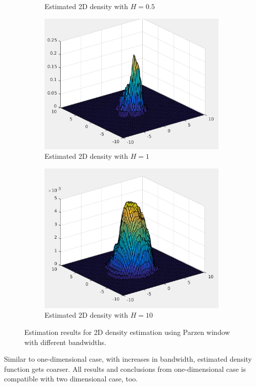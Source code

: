\documentclass[12pt]{article}
\begin{document}
\begin{itemize}
\begin{figure}[h]
\begin{subfigure}{0.45\textwidth}
\caption{Estimated 2D density with $H = 0.5$}
\end{subfigure}
\begin{subfigure}{0.45\textwidth}
\centering
\includegraphics[scale=0.35]{Imgs/5-30.png}
\caption{Estimated 2D density with $H = 1$}
\end{subfigure}
\begin{subfigure}{0.45\textwidth}
\centering
\includegraphics[scale=0.32]{Imgs/5-31.png}
\caption{Estimated 2D density with $H = 10$}
\end{subfigure}
\caption{Estimation results for 2D density estimation using Parzen window with different bandwidths.}
\label{fig:5-5}
\end{figure}
Similar to one-dimensional case, with increases in bandwidth, estimated density function gets coarser. All results and conclusions from one-dimensional case is compatible with two dimensional case, too.


\end{itemize}
\end{document}
